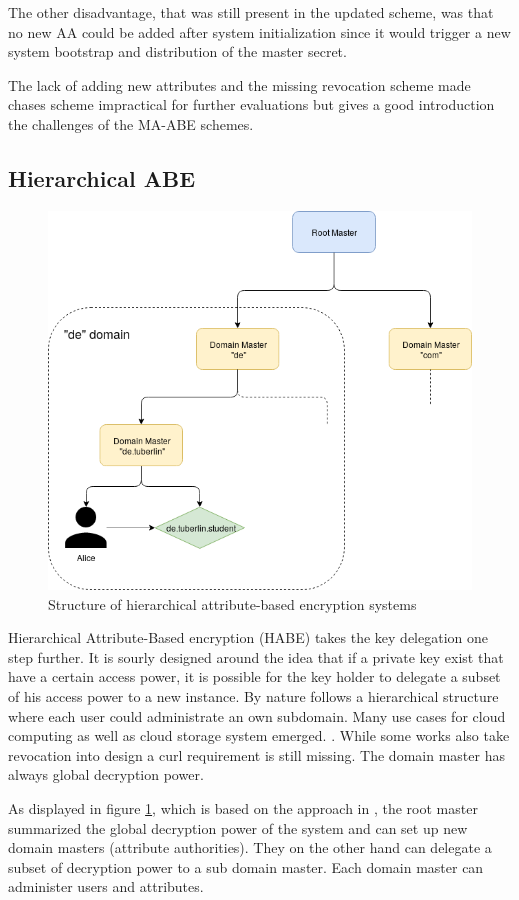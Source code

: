 The other disadvantage, that was still present in the updated scheme, was that no new \ac{AA} could be added after system initialization since it would trigger a new system bootstrap and distribution of the master secret. 

The lack of adding new attributes and the missing revocation scheme made chases scheme impractical for further evaluations but gives a good introduction the challenges of the \ac{MA-ABE} schemes.

\subsection{Hierarchical \ac{ABE}}
\label{sec:HABE}

\begin{figure}[!ht]
\centering
    \includegraphics[width=0.7\linewidth]{img/HABE.png}
    \caption{Structure of hierarchical attribute-based encryption systems}
    \label{fig:habe}
\end{figure}

Hierarchical Attribute-Based encryption (\ac{HABE}) takes the key delegation one step further. It is sourly designed around the idea that if a private key exist that have a certain access power, it is possible for the key holder to delegate a subset of his access power to a new instance. By nature follows a hierarchical structure where each user could administrate an own subdomain. Many use cases for cloud computing as well as cloud storage system emerged. \cite{Wang:2010:HAE:1866307.1866414}. While some works also take revocation into design a curl requirement is still missing. The domain master has always global decryption power. 

As displayed in figure \ref{fig:habe}, which is based on the approach in \cite{wang2011hierarchical}, the root master summarized the global decryption power of the system and can set up new domain masters (attribute authorities). They on the other hand can delegate a subset of decryption power to a sub domain master. Each domain master can administer users and attributes.

